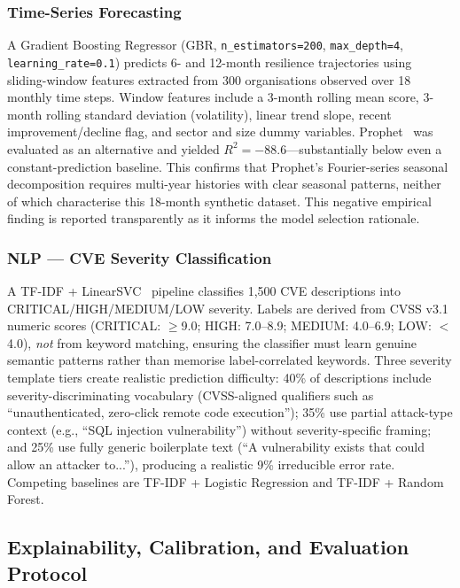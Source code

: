 \documentclass[journal]{IEEEtran}
\begin{document}
\subsubsection{Time-Series Forecasting}
A Gradient Boosting Regressor (GBR, \texttt{n\_estimators=200},
\texttt{max\_depth=4}, \texttt{learning\_rate=0.1}) predicts 6- and
12-month resilience trajectories using sliding-window features extracted from
300 organisations observed over 18 monthly time steps. Window features include
a 3-month rolling mean score, 3-month rolling standard deviation (volatility),
linear trend slope, recent improvement/decline flag, and sector and size
dummy variables. Prophet~\cite{taylor2018prophet} was evaluated as an
alternative and yielded $R^2 = -88.6$---substantially below even a
constant-prediction baseline. This confirms that Prophet's Fourier-series
seasonal decomposition requires multi-year histories with clear seasonal
patterns, neither of which characterise this 18-month synthetic dataset.
This negative empirical finding is reported transparently as it informs the
model selection rationale.

\subsubsection{NLP --- CVE Severity Classification}
A TF-IDF + LinearSVC~\cite{sklearn2011} pipeline classifies 1,500 CVE
descriptions into CRITICAL/HIGH/MEDIUM/LOW severity. Labels are derived
from CVSS v3.1 numeric scores (CRITICAL: $\geq$9.0; HIGH: 7.0--8.9;
MEDIUM: 4.0--6.9; LOW: $<$4.0), \emph{not} from keyword matching, ensuring
the classifier must learn genuine semantic patterns rather than memorise
label-correlated keywords. Three severity template tiers create realistic
prediction difficulty: 40\% of descriptions include severity-discriminating
vocabulary (CVSS-aligned qualifiers such as ``unauthenticated,
zero-click remote code execution''); 35\% use partial attack-type context
(e.g., ``SQL injection vulnerability'') without severity-specific framing;
and 25\% use fully generic boilerplate text (``A vulnerability exists that
could allow an attacker to...''), producing a realistic 9\% irreducible
error rate. Competing baselines are TF-IDF + Logistic Regression and
TF-IDF + Random Forest.

\subsection{Explainability, Calibration, and Evaluation Protocol}
\end{document}
